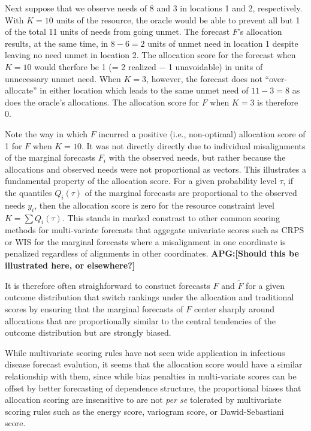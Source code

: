 \documentclass{article}
\def\apg#1{{\color{red}\textbf{APG:[#1]}}}
\begin{document}
Next suppose that we observe needs of 8 and 3 in locations 1 and 2, respectively. With $K = 10$ units of the resource, the oracle would be able to prevent all
but 1 of the total 11 units of needs from going unmet. The forecast $F$'s allocation results, at the same time, in $8 - 6 = 2$ units of unmet need in location 1 despite leaving no need unmet in location 2. The allocation score for the forecast when $K = 10$ would therfore be
1 (= 2 realized $-$  1 unavoidable) in units of unnecessary unmet need.  When $K = 3$, however, the forecast does not ``over-allocate'' in either location which leads to the same unmet need of $11 - 3 = 8$ as does the oracle's allocations.  The allocation score for $F$ when $K = 3$ is therefore 0.

Note the way in which $F$ incurred a positive (i.e., non-optimal) allocation score of 1 for $F$ when $K = 10$. It was not directly directly due to individual misalignments 
of the marginal forecasts $F_i$ with the observed needs, but rather because the allocations and observed needs were not proportional as vectors.
This illustrates a fundamental property of the allocation score.  For a given probability level $\tau$, if the quantiles $Q_i(\tau)$ of the marginal forecasts
are proportional to the observed needs $y_i$, then the allocation score is zero for the resource constraint level $K = \sum Q_i(\tau)$. This stands in marked constrast to other common scoring methods for multi-variate forecasts that aggegate univariate scores such as CRPS or WIS for the marginal forecasts where a 
misalignment in one coordinate is penalized regardless of alignments in other coordinates. \apg{Should this be illustrated here, or elsewhere?}

It is therefore often straighforward to constuct forecasts $F$ and $\widetilde{F}$ for a given outcome distribution that switch rankings under the allocation and traditional scores by ensuring that the marginal forecasts of $F$ center sharply around allocations that are proportionally similar to the central tendencies of the outcome distribution but are strongly biased.

While multivariate scoring rules have not seen wide application in infectious disease forecast evalution, it seems that the allocation score would have a similar relationship with them, since while bias penalties in multi-variate scores can be offset by better forecasting of dependence structure, the proportional biases that allocation scoring are insensitive to are not \emph{per se} tolerated by multivariate scoring rules such as the energy score, variogram score, or Dawid-Sebastiani score. 
\end{document}
